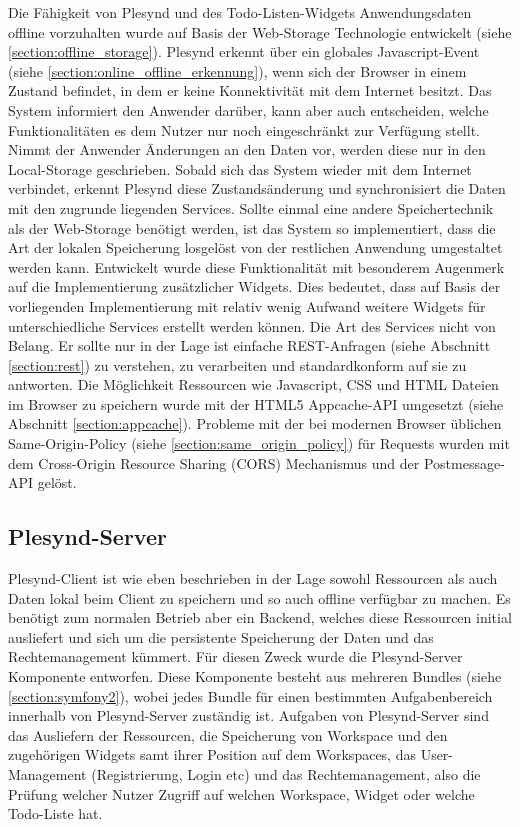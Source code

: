 Die Fähigkeit von Plesynd und des Todo-Listen-Widgets Anwendungsdaten offline vorzuhalten wurde auf Basis der Web-Storage Technologie entwickelt (siehe \ref{section:offline_storage}). Plesynd erkennt über ein globales Javascript-Event (siehe \ref{section:online_offline_erkennung}), wenn sich der Browser in einem Zustand befindet, in dem er keine Konnektivität mit dem Internet besitzt. Das System informiert den Anwender darüber, kann aber auch entscheiden, welche Funktionalitäten es dem Nutzer nur noch eingeschränkt zur Verfügung stellt. Nimmt der Anwender Änderungen an den Daten vor, werden diese nur in den Local-Storage geschrieben. Sobald sich das System wieder mit dem Internet verbindet, erkennt Plesynd diese Zustandsänderung und synchronisiert die Daten mit den zugrunde liegenden Services. Sollte einmal eine andere Speichertechnik als der Web-Storage benötigt werden, ist das System so implementiert, dass die Art der lokalen Speicherung losgelöst von der restlichen Anwendung umgestaltet werden kann. Entwickelt wurde diese Funktionalität mit besonderem Augenmerk auf die Implementierung zusätzlicher Widgets. Dies bedeutet, dass auf Basis der vorliegenden Implementierung mit relativ wenig Aufwand weitere Widgets für unterschiedliche Services erstellt werden können. Die Art des Services nicht von Belang. Er sollte nur in der Lage ist einfache REST-Anfragen (siehe Abschnitt \ref{section:rest}) zu verstehen, zu verarbeiten und standardkonform auf sie zu antworten. Die Möglichkeit Ressourcen wie Javascript, CSS und HTML Dateien im Browser zu speichern wurde mit der HTML5 Appcache-API umgesetzt (siehe Abschnitt \ref{section:appcache}). Probleme mit der bei modernen Browser üblichen Same-Origin-Policy (siehe \ref{section:same_origin_policy}) für Requests wurden mit dem Cross-Origin Resource Sharing (CORS) Mechanismus und der Postmessage-API gelöst. 

\subsection{Plesynd-Server}
Plesynd-Client ist wie eben beschrieben in der Lage sowohl Ressourcen als auch Daten lokal beim Client zu speichern und so auch offline verfügbar zu machen. Es benötigt zum normalen Betrieb aber ein Backend, welches diese Ressourcen initial ausliefert und sich um die persistente Speicherung der Daten und das Rechtemanagement kümmert. Für diesen Zweck wurde die Plesynd-Server Komponente entworfen. Diese Komponente besteht aus mehreren Bundles (siehe \ref{section:symfony2}), wobei jedes Bundle für einen bestimmten Aufgabenbereich innerhalb  von Plesynd-Server zuständig ist. Aufgaben von Plesynd-Server sind das Ausliefern der Ressourcen, die Speicherung von Workspace und den zugehörigen Widgets samt ihrer Position auf dem Workspaces, das User-Management (Registrierung, Login etc) und das Rechtemanagement, also die Prüfung welcher Nutzer Zugriff auf welchen Workspace, Widget oder welche Todo-Liste hat. 

